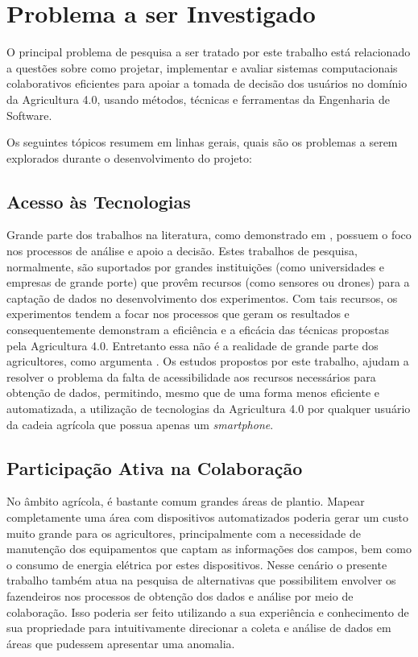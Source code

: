 \documentclass[12pt]{article}
\begin{document}
\section{Problema a ser Investigado}
\label{sec:problema_investigado}

O principal problema de pesquisa a ser tratado por este trabalho está relacionado a questões sobre como projetar, implementar e avaliar sistemas computacionais colaborativos eficientes para apoiar a tomada de decisão dos usuários no domínio da Agricultura 4.0, usando métodos, técnicas e ferramentas da Engenharia de Software.

Os seguintes tópicos resumem em linhas gerais, quais são os problemas a serem explorados durante o desenvolvimento do projeto:

\subsection{Acesso às Tecnologias}
\label{subsec:acesso_tecnologias}

Grande parte dos trabalhos na literatura, como demonstrado em \cite{Massruha:2017}, possuem o foco nos processos de análise e apoio a decisão. Estes trabalhos de pesquisa, normalmente, são suportados por grandes instituições (como universidades e empresas de grande porte) que provêm recursos (como sensores ou drones) para a captação de dados no desenvolvimento dos experimentos. Com tais recursos, os experimentos tendem a focar nos processos que geram os resultados e consequentemente demonstram a eficiência e a eficácia das técnicas propostas pela Agricultura 4.0. Entretanto essa não é a realidade de grande parte dos agricultores, como argumenta \cite{Rose:2019}. Os estudos propostos por este trabalho, ajudam a resolver o problema da falta de acessibilidade aos recursos necessários para obtenção de dados, permitindo, mesmo que de uma forma menos eficiente e automatizada, a utilização de tecnologias da Agricultura 4.0 por qualquer usuário da cadeia agrícola que possua apenas um \textit{smartphone}.

\subsection{Participação Ativa na Colaboração}
\label{subsec:participacao_ativa_colaboracao}

No âmbito agrícola, é bastante comum grandes áreas de plantio. Mapear completamente uma área com dispositivos automatizados poderia gerar um custo muito grande para os agricultores, principalmente com a necessidade de manutenção dos equipamentos que captam as informações dos campos, bem como o consumo de energia elétrica por estes dispositivos. Nesse cenário o presente trabalho também atua na pesquisa de alternativas que possibilitem envolver os fazendeiros nos processos de obtenção dos dados e análise por meio de colaboração. Isso poderia ser feito utilizando a sua experiência e conhecimento de sua propriedade para intuitivamente direcionar a coleta e análise de dados em áreas que pudessem apresentar uma anomalia.
\end{document}
